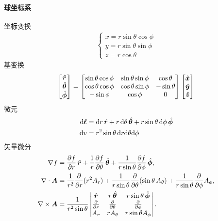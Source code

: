 \paragraph{球坐标系}坐标变换
\begin{align}
    \begin{cases}
        x=r\sin\theta\cos\phi\\
        y=r\sin\theta\sin\phi\\
        z=r\cos\theta
    \end{cases}
\end{align}
基变换
\begin{equation}
    \begin{bmatrix}
        \mathop{}\!\hat{\bm r}\\\mathop{}\!\hat{\bm \theta}\\\mathop{}\!\hat{\bm \phi}
    \end{bmatrix}=
    \begin{bmatrix}
        \sin\theta\cos\phi&\sin\theta\sin\phi&\cos\theta\\
        \cos\theta\cos\phi&\cos\theta\sin\phi&-\sin\theta\\
        -\sin\phi&\cos\phi&0
    \end{bmatrix}
    \begin{bmatrix}
        \mathop{}\!\hat{\bm x}\\\mathop{}\!\hat{\bm y}\\\mathop{}\!\hat{\bm z}
    \end{bmatrix}
\end{equation}
微元
\begin{align}
    \d\bm\ell&=\d r\uvec r+r\d\theta\uvec\theta+r\sin\theta\d\phi\uvec\phi\\
    \d v&=r^2\sin\theta\d r\nd\theta\nd\phi
\end{align}
矢量微分
\begin{align}
    \nabla f&=\pv fr\uvec r+\frac1r\pv f\theta\uvec\theta+\frac1{r\sin\theta}\pv f\phi\uvec\phi,\\
    \div\bm A&=\frac1{r^2}\pp r(r^2A_r)+\frac1{r\sin\theta}\pp\theta(\sin\theta\,A_\theta)+\frac1{r\sin\theta}\pp\phi A_\phi,\\
    \curl\bm A&=\frac1{r^2\sin\theta}
    \begin{vmatrix}
        \uvec r&r\uvec\theta&r\sin\theta\uvec\phi\\
        \pp r&\pp\theta&\pp\phi\\
        A_r&rA_\theta&r\sin\theta A_\phi
    \end{vmatrix}.
\end{align}

